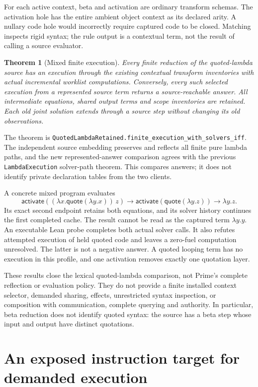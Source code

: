 \documentclass[11pt]{article}
\newtheorem{theorem}{Theorem}
\newcommand{\code}[1]{\texttt{\small #1}}
\begin{document}
For each active context, beta and activation are ordinary transform schemas.
The activation hole has the entire ambient object context as its declared
arity. A nullary code hole would incorrectly require captured code to be
closed. Matching inspects rigid syntax; the rule output is a contextual
term, not the result of calling a source evaluator.

\begin{theorem}[Mixed finite execution]
Every finite reduction of the quoted-lambda source has an execution through
the existing contextual transform inventories with actual incremental
worklist computations. Conversely, every such selected execution from a
represented source term returns a source-reachable answer. All intermediate
equations, shared output terms and scope inventories are retained. Each old
joint solution extends through a source step without changing its old
observations.
\end{theorem}
The theorem is \code{QuotedLambdaRetained.finite\_execution\_with\_solvers\_iff}.
The independent source embedding preserves and reflects all finite pure
lambda paths, and the new represented-answer comparison agrees with the
previous \code{LambdaExecution} solver-path theorem. This compares answers;
it does not identify private declaration tables from the two clients.

A concrete mixed program evaluates
\[
 \mathsf{activate}((\lambda x.\mathsf{quote}(\lambda y.x))\,z)
 \longrightarrow \mathsf{activate}(\mathsf{quote}(\lambda y.z))
 \longrightarrow \lambda y.z.
\]
Its exact second endpoint retains both equations, and its solver history
continues the first completed cache. The result cannot be read as the
captured term $\lambda y.y$. An executable Lean probe completes both actual
solver calls. It also refutes attempted execution of held quoted code and
leaves a zero-fuel computation unresolved. The latter is not a negative
answer. A quoted looping term has no execution in this profile, and one
activation removes exactly one quotation layer.

These results close the lexical quoted-lambda comparison, not Prime's
complete reflection or evaluation policy. They do not provide a finite
installed context selector, demanded sharing, effects, unrestricted syntax
inspection, or composition with communication, complete querying and
authority. In particular, beta reduction does not identify quoted syntax:
the source has a beta step whose input and output have distinct quotations.

\section{An exposed instruction target for demanded execution}
\end{document}
